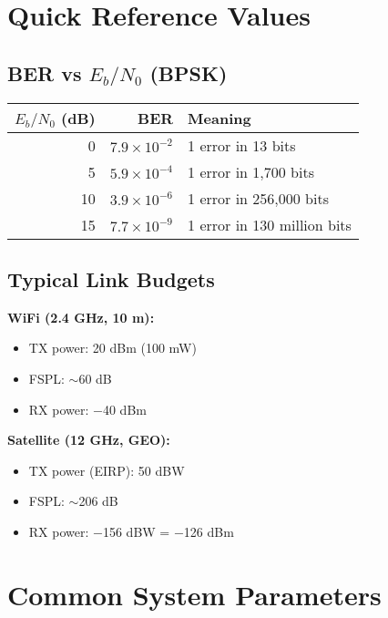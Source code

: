 \section{Quick Reference Values}
\label{sec:quick-reference-values}

\subsection{BER vs $E_b/N_0$ (BPSK)}

\begin{center}
\begin{tabular}{@{}rrl@{}}
\toprule
$E_b/N_0$ (dB) & BER & Meaning \\
\midrule
0 & $7.9 \times 10^{-2}$ & 1 error in 13 bits \\
5 & $5.9 \times 10^{-4}$ & 1 error in 1,700 bits \\
10 & $3.9 \times 10^{-6}$ & 1 error in 256,000 bits \\
15 & $7.7 \times 10^{-9}$ & 1 error in 130 million bits \\
\bottomrule
\end{tabular}
\end{center}

\subsection{Typical Link Budgets}

\textbf{WiFi (2.4 GHz, 10 m):}
\begin{itemize}
\item TX power: 20 dBm (100 mW)
\item FSPL: $\sim$60 dB
\item RX power: $-$40 dBm
\end{itemize}

\textbf{Satellite (12 GHz, GEO):}
\begin{itemize}
\item TX power (EIRP): 50 dBW
\item FSPL: $\sim$206 dB
\item RX power: $-$156 dBW = $-$126 dBm
\end{itemize}

\section{Common System Parameters}
\label{sec:common-systems}

